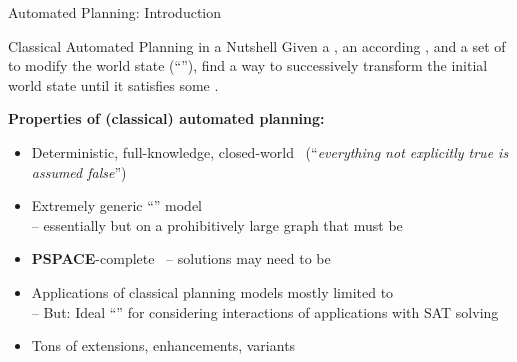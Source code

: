 \documentclass[t,english]{sdqbeamer}
\begin{document}
\begin{frame}{Automated Planning: Introduction}
	\begin{blueblock}{Classical Automated Planning in a Nutshell}
		Given a , an according , and a set of  to modify the world state (``''),
		find a way to successively transform the initial world state until it satisfies some .
	\end{blueblock}
	
	\vspace*{3mm}
	\textbf{Properties of (classical) automated planning:}
	\begin{itemize}
		\item Deterministic, full-knowledge, closed-world~\cite{reiter1981closed} (``\textit{everything not explicitly true is assumed false}'')
		\item Extremely generic ``'' model
		\\-- essentially  but on a prohibitively large graph that must be 
		\item {\sffamily \textbf{PSPACE}}-complete~\cite{bylander1994computational} -- solutions may need to be 
		\item Applications of classical planning models mostly limited to 
		\\-- But: Ideal ``'' for considering interactions of applications with SAT solving
		\item Tons of extensions, enhancements, variants
	\end{itemize}
\end{frame}
\end{document}
